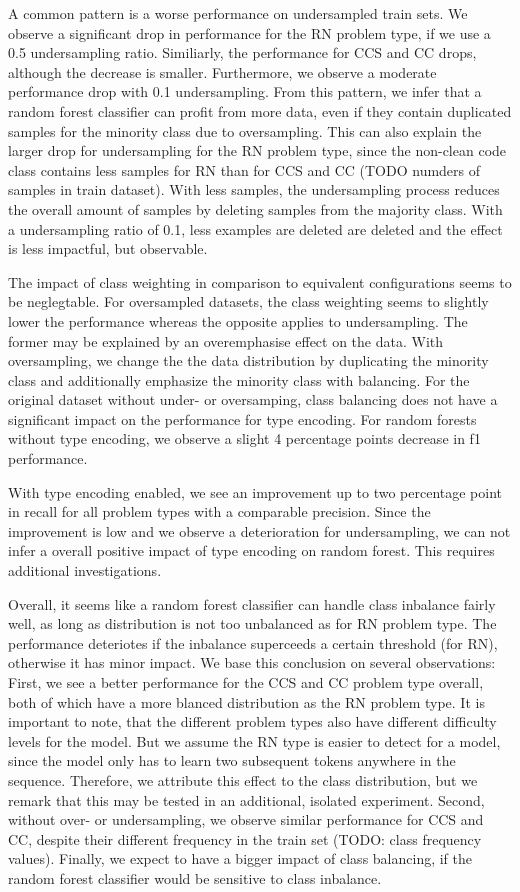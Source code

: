 A common pattern is a worse performance on undersampled train sets. We observe a significant drop in performance for the RN problem type, if we use a 0.5 undersampling ratio. Similiarly, the performance for CCS and CC drops, although the decrease is smaller. Furthermore, we observe a moderate performance drop with 0.1 undersampling. From this pattern, we infer that a random forest classifier can profit from more data, even if they contain duplicated samples for the minority class due to oversampling. This can also explain the larger drop for undersampling for the RN problem type, since the non-clean code class contains less samples for RN than for CCS and CC (TODO numders of samples in train dataset). With less samples, the undersampling process reduces the overall amount of samples by deleting samples from the majority class. With a undersampling ratio of 0.1, less examples are deleted are deleted and the effect is less impactful, but observable.

The impact of class weighting in comparison to equivalent configurations seems to be neglegtable. For oversampled datasets, the class weighting seems to slightly lower the performance whereas the opposite applies to undersampling. The former may be explained by an overemphasise effect on the data. With oversampling, we change the the data distribution by duplicating the minority class and additionally emphasize the minority class with balancing. For the original dataset without under- or oversamping, class balancing does not have a significant impact on the performance for type encoding. For random forests without type encoding, we observe a slight 4 percentage points decrease in f1 performance. 

With type encoding enabled, we see an improvement up to two percentage point in recall for all problem types with a comparable precision. Since the improvement is low and we observe a deterioration for undersampling, we can not infer a overall positive impact of type encoding on random forest. This requires additional investigations.

Overall, it seems like a random forest classifier can handle class inbalance fairly well, as long as distribution is not too unbalanced as for RN problem type. The performance deteriotes if the inbalance superceeds a certain threshold (for RN), otherwise it has minor impact.
We base this conclusion on several observations: First, we see a better performance for the CCS and CC problem type overall, both of which have a more blanced distribution as the RN problem type. It is important to note, that the different problem types also have different difficulty levels for the model. But we assume the RN type is easier to detect for a model, since the model only has to learn two subsequent tokens anywhere in the sequence. Therefore, we attribute this effect to the class distribution, but we remark that this may be tested in an additional, isolated experiment. Second, without over- or undersampling, we observe similar performance for CCS and CC, despite their different frequency in the train set (TODO: class frequency values). 
Finally, we expect to have a bigger impact of class balancing, if the random forest classifier would be sensitive to class inbalance.


